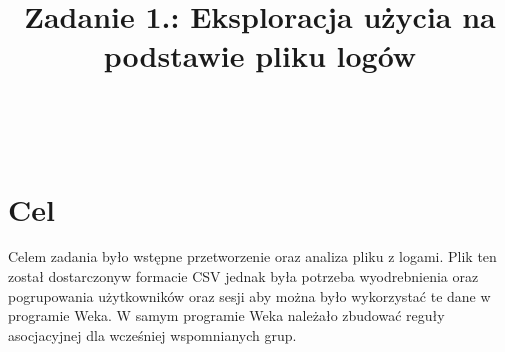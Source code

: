 \documentclass{classrep}
\author{%
    \studentinfo[239671@edu.p.lodz.pl]{Jan Karwowski}{239671}\\
    \studentinfo[239676@edu.p.lodz.pl]{Kamil Kowalewski}{239676}\\
}
\title{Zadanie 1.: Eksploracja użycia na podstawie pliku logów}
\begin{document}
    \maketitle
    \thispagestyle{fancyplain}

    \tableofcontents
    \newpage

    \section{Cel}
    \label{purpose} {
        Celem zadania było wstępne przetworzenie oraz analiza pliku z
        logami\cite{dataset}. Plik ten został dostarczonyw formacie CSV jednak
        była potrzeba wyodrebnienia oraz pogrupowania użytkowników oraz sesji aby
        można było wykorzystać te dane w programie Weka\cite{weka}. W samym programie Weka
        należało zbudować reguły asocjacyjnej dla wcześniej wspomnianych grup.
    }
\end{document}
